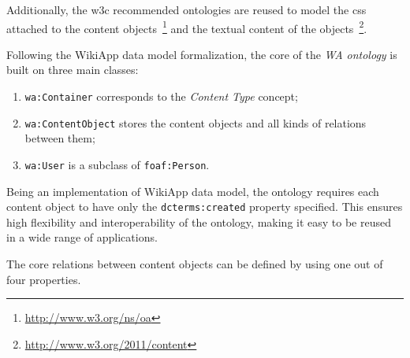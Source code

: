 \documentclass[PhD, Submit, ngerman,UKenglish,table]{scrbook}
\begin{document}
Additionally, the \gls{w3c} recommended ontologies are reused to model the \gls{css} attached to the content objects~\footnote{\url{http://www.w3.org/ns/oa}} and the textual content of the objects~\footnote{\url{http://www.w3.org/2011/content}}.

Following the WikiApp data model formalization, the core of the \emph{WA ontology} is built on three main classes:
\begin{enumerate}
\item \verb|wa:Container| corresponds to the \emph{Content Type} concept; 
\item \verb|wa:ContentObject| stores the content objects and all kinds of relations between them; 
\item \verb|wa:User| is a subclass of \verb|foaf:Person|.
\end{enumerate} 

Being an implementation of WikiApp data model, the ontology requires each content object to have only the \verb|dcterms:created| property specified. 
This ensures high flexibility and interoperability of the ontology, making it easy to be reused in a wide range of applications.

The core relations between content objects can be defined by using one out of four properties.
\end{document}
